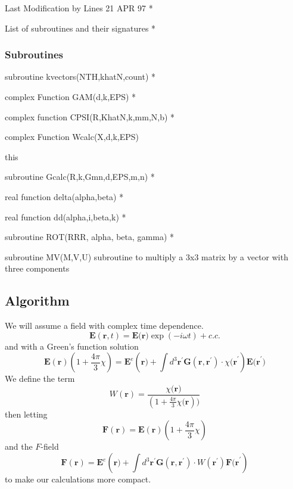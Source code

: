 \documentclass{article}
\begin{document}
Last Modification by Lines 21 APR 97 *

List of subroutines and their signatures *

\subsubsection{Subroutines}

subroutine kvectors(NTH,khatN,count) *

complex Function GAM(d,k,EPS) *

complex function CPSI(R,KhatN,k,mm,N,b) *

complex Function Wcalc(X,d,k,EPS)

this

subroutine Gcalc(R,k,Gmn,d,EPS,m,n) *

real function delta(alpha,beta) *

real function dd(alpha,i,beta,k) *

subroutine ROT(RRR, alpha, beta, gamma) *

subroutine MV(M,V,U) subroutine to multiply a 3x3 matrix by a vector with
three components

\subsection{Algorithm}

We will assume a field with complex time dependence.%
\begin{equation}
\mathbf{E}\left( \mathbf{r},t\right) =\mathbf{E(r})\exp (-i\omega t)+c.c.
\label{Field}
\end{equation}%
and with a Green's function solution 
\begin{equation}
\mathbf{E}(\mathbf{r})(1+\frac{4\pi }{3}\chi )=\mathbf{E}^{e}(\mathbf{r)+}%
\int d^{3}\mathbf{r}^{\prime }\mathbf{G}\left( \mathbf{r},\mathbf{r}^{\prime
}\right) \cdot \chi \mathbf{(r}^{\prime })\mathbf{E(r}^{\prime })
\label{E-field}
\end{equation}%
We define the term%
\begin{equation}
W\left( \mathbf{r}\right) =\frac{\chi \mathbf{(r})}{(1+\frac{4\pi }{3}\chi 
\mathbf{(r}))}  \label{W1}
\end{equation}%
then letting 
\[
\mathbf{F}(\mathbf{r})=\mathbf{E}(\mathbf{r})(1+\frac{4\pi }{3}\chi )
\]%
and the $F$-field 
\begin{equation}
\mathbf{F}(\mathbf{r})=\mathbf{E}^{e}(\mathbf{r)+}\int d^{3}\mathbf{r}%
^{\prime }\mathbf{G}\left( \mathbf{r},\mathbf{r}^{\prime }\right) \cdot
W\left( \mathbf{r}^{\prime }\right) \mathbf{F(r}^{\prime })  \label{F-field}
\end{equation}%
to make our calculations more compact.
\end{document}
